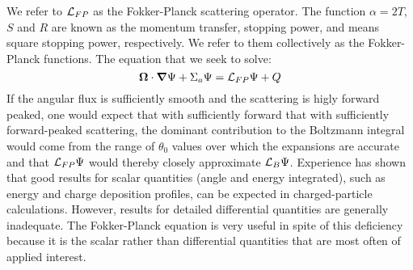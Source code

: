 We refer to $\mathcal{L}_{FP}$ as the Fokker-Planck scattering operator. The
function $\alpha=2T$, $S$ and $R$ are known as the momentum transfer,
stopping power, and means square stopping power, respectively. We refer to
them collectively as the Fokker-Planck functions. The equation that we seek to
solve:
\begin{equation}
\boldsymbol{\Omega}\cdot\boldsymbol{\nabla}\Psi +\Sigma_a \Psi = \mathcal{L}_{FP} \Psi+Q
\end{equation}
If the angular flux is sufficiently smooth and the scattering is higly forward
peaked, one would expect that with sufficiently forward that with
sufficiently forward-peaked scattering, the dominant contribution to the
Boltzmann integral would come from the range of $\theta_0$ values over which
the expansions are accurate and that $\mathcal{L}_{FP}\Psi$ would thereby closely
approximate $\mathcal{L}_B\Psi$. Experience has shown that good results for scalar
quantities (angle and energy integrated), such as energy and charge deposition
profiles, can be expected in charged-particle calculations. However, results
for detailed differential quantities are generally inadequate. The
Fokker-Planck equation is very useful in spite of this deficiency because it
is the scalar rather than differential quantities that are most often of
applied interest.

